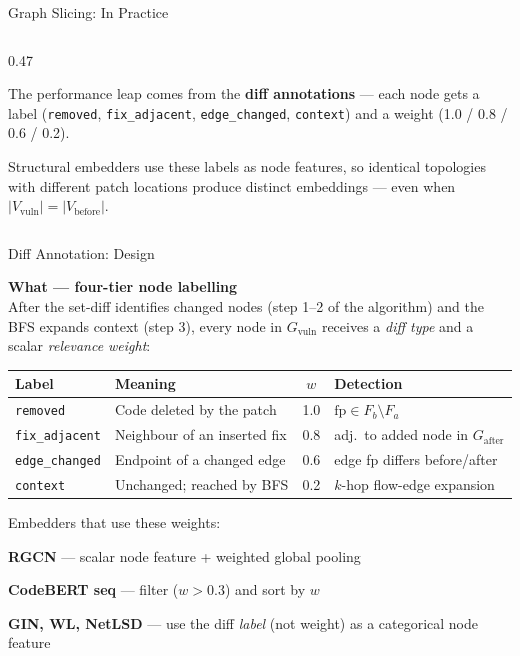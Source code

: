 \documentclass[aspectratio=169,10pt]{beamer}
\begin{document}
\begin{frame}{Graph Slicing: In Practice}
\begin{columns}[T]
\begin{column}{0.47\textwidth}
  \vspace{0.6em}
  \raggedright
  The performance leap comes from the
  \textbf{diff annotations} — each node gets a label
  (\texttt{removed}, \texttt{fix\_adjacent},
  \texttt{edge\_changed}, \texttt{context}) and a weight
  (1.0 / 0.8 / 0.6 / 0.2).

  \vspace{0.4em}
  {\scriptsize\color{black!55}
  Structural embedders use these labels as node features,
  so identical topologies with different patch locations
  produce distinct embeddings — even when $|V_{\text{vuln}}|
  = |V_{\text{before}}|$.}

\end{column}
\end{columns}
\end{frame}

\begin{frame}{Diff Annotation: Design}

  \textbf{What — four-tier node labelling}\\[3pt]
  After the set-diff identifies changed nodes (step 1--2 of the
  algorithm) and the BFS expands context (step 3), every node in
  $G_{\text{vuln}}$ receives a \emph{diff type} and a scalar
  \emph{relevance weight}:

  \vspace{0.4em}
  {\scriptsize
  \renewcommand{\arraystretch}{1.15}
  \begin{tabular}{llcl}
    \toprule
    \textbf{Label} & \textbf{Meaning} & $w$ & \textbf{Detection} \\
    \midrule
    \texttt{removed}      & Code deleted by the patch
      & 1.0 & $\text{fp} \in F_b \setminus F_a$ \\
    \texttt{fix\_adjacent} & Neighbour of an inserted fix
      & 0.8 & adj.\ to added node in $G_{\text{after}}$ \\
    \texttt{edge\_changed} & Endpoint of a changed edge
      & 0.6 & edge fp differs before/after \\
    \texttt{context}       & Unchanged; reached by BFS
      & 0.2 & $k$-hop flow-edge expansion \\
    \bottomrule
  \end{tabular}}

  \vspace{0.5em}
  Embedders that use these weights:
  \begin{itemize}\setlength{\itemsep}{1pt}
    {
    \item \textbf{RGCN} — scalar node feature + weighted global pooling
    \item \textbf{CodeBERT seq} — filter ($w > 0.3$) and sort by $w$
    \item \textbf{GIN, WL, NetLSD} — use the diff \emph{label} (not weight)
          as a categorical node feature}
  \end{itemize}
\end{frame}
\end{document}
